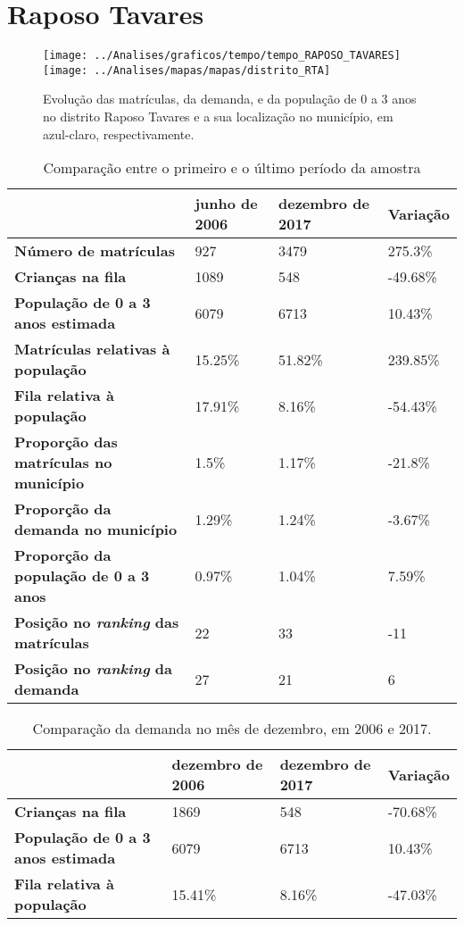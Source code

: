 \section{Raposo Tavares}
\begin{figure}[H]
\centering
\texttt{[image: ../Analises/graficos/tempo/tempo\_RAPOSO\_TAVARES]}
\texttt{[image: ../Analises/mapas/mapas/distrito\_RTA]}
\caption{Evolução das matrículas, da demanda, e da população de 0 a 3 anos no distrito Raposo Tavares e a sua localização no município, em azul-claro, respectivamente.}
\end{figure}
\begin{table}[H]
\begin{tabular}{l|l|l|l}
\textbf{}                                      & \textbf{junho de 2006}       & \textbf{dezembro de 2017}    & \textbf{Variação} \\ \hline
\textbf{Número de matrículas}                  & 927 & 3479 & 275.3\% \\ \hline
\textbf{Crianças na fila}                      & 1089 & 548 & -49.68\% \\ \hline
\textbf{População de 0 a 3 anos estimada}      & 6079 & 6713 & 10.43\% \\ \hline
\textbf{Matrículas relativas à população}      & 15.25\% & 51.82\% & 239.85\% \\ \hline
\textbf{Fila relativa à população}             & 17.91\% & 8.16\% & -54.43\% \\ \hline
\textbf{Proporção das matrículas no município} & 1.5\% & 1.17\% & -21.8\% \\ \hline
\textbf{Proporção da demanda no município}     & 1.29\% & 1.24\% & -3.67\% \\ \hline
\textbf{Proporção da população de 0 a 3 anos}  & 0.97\% & 1.04\% & 7.59\% \\ \hline
\textbf{Posição no \textit{ranking} das matrículas}     & 22 & 33 & -11 \\ \hline
\textbf{Posição no \textit{ranking} da demanda}         & 27 & 21 & 6 \\ 
\end{tabular}
\caption{Comparação entre o primeiro e o último período da amostra}
\end{table}
\begin{table}[H]
\begin{tabular}{l|l|l|l}
\textbf{}                                 & \textbf{dezembro de 2006} & \textbf{dezembro de 2017} & \textbf{Variação} \\ \hline
\textbf{Crianças na fila}                      & 1869 & 548 & -70.68\% \\ \hline
\textbf{População de 0 a 3 anos estimada}      & 6079 & 6713 & 10.43\% \\ \hline
\textbf{Fila relativa à população}             & 15.41\% & 8.16\% & -47.03\% \\
\end{tabular}
\caption{Comparação da demanda no mês de dezembro, em 2006 e 2017.}
\end{table}
